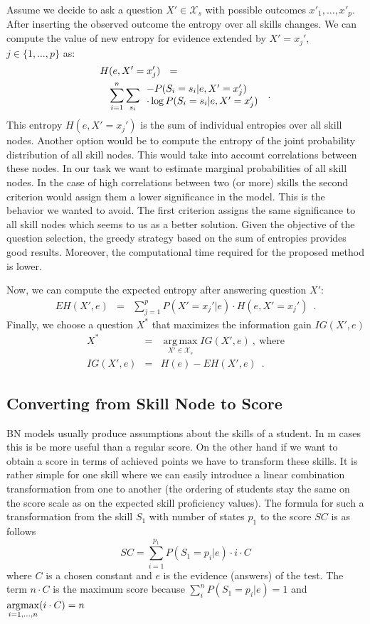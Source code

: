 Assume we decide to ask a question $X' \in \mathcal{X}_s$ with possible outcomes $x'_1,\ldots,x'_p$. 
After inserting the observed outcome the entropy over all skills changes. 
We can compute the value of new entropy for evidence extended by $X' = x_j'$, $j \in \{1,\ldots,p\}$ as:
\begin{eqnarray*}
\lefteqn{H(e,X'=x_j') \ \ =}\\
& & \sum_{i =1}^n \sum_{s_i} \begin{array}{ll}
-P(S_i=s_i|e,X'=x_j')\\
\cdot \log P(S_i=s_i|e,X'=x_j') 
\end{array}\enspace .
\end{eqnarray*}
This entropy $H(e,X'=x_j')$ is the sum of individual entropies over all skill nodes. Another option would be to compute the entropy of the joint probability distribution of all skill nodes. This would take into account correlations between these nodes. In our task we want to estimate marginal probabilities of all skill nodes. In the case of high correlations between two (or more) skills the second criterion would assign them a lower significance in the model. This is the behavior we wanted to avoid. The first criterion assigns the same significance to all skill nodes which seems to us as a better solution. Given the objective of the question selection, the greedy strategy based on the sum of entropies provides good results. Moreover, the computational time required for the proposed method is lower.

Now, we can compute the expected entropy after answering question $X'$: 
\begin{eqnarray*}
EH(X',e) & = & \sum_{j=1}^p P(X'=x_j'|e) \cdot H(e,X'=x_j') \enspace .
\end{eqnarray*}
Finally, we choose a question $X^*$ that maximizes the information gain $IG(X',e)$
\begin{eqnarray*}
X^* & = & \operatorname*{arg\,max}_{X' \in \mathcal{X}_s} IG(X',e) \ , \ \mbox{where}\\
IG(X',e) & = & H(e)  - EH(X',e) \enspace .
\end{eqnarray*}


\subsection{Converting from Skill Node to Score}
\label{sec:converting_skill}
BN models usually produce assumptions about the skills of a student. In m cases this is be more useful than a regular score. On the other hand if we want to obtain a score in terms of achieved points we have to transform these skills. It is rather simple for one skill where we can easily introduce a linear combination transformation from one to another (the ordering of students stay the same on the score scale as on the expected skill proficiency values). The formula for such a transformation from the skill $S_1$ with number of states $p_1$ to the score $SC$ is as follows
$$SC = \sum_{i=1}^{p_1}{P(S_1=p_i|e)\cdot i\cdot C} $$
where $C$ is a chosen constant and $e$ is the evidence (answers) of the test. The term $n\cdot C$ is the maximum score because $\sum_{i}^n{P(S_1=p_i|e)} = 1$ and $\underset{i=1,\ldots, n}{\operatorname*{\arg\!\max}} (i\cdot C) = n$

